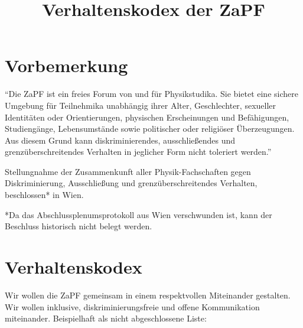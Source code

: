 \documentclass[12pt,oneside]{scrartcl}
\begin{document}
\title{Verhaltenskodex der ZaPF%
  \label{verhaltenskodex-der-zapf}}
\author{}
\date{}
\maketitle


\section{Vorbemerkung%
  \label{vorbemerkung}%
}

“Die ZaPF ist ein freies Forum von und für Physikstudika. Sie bietet eine
sichere Umgebung für Teilnehmika unabhängig ihrer Alter, Geschlechter, sexueller
Identitäten oder Orientierungen, physischen Erscheinungen und Befähigungen,
Studiengänge, Lebensumstände sowie politischer oder religiöser
Überzeugungen. Aus diesem Grund kann diskriminierendes, ausschließendes und
grenzüberschreitendes Verhalten in jeglicher Form nicht toleriert werden.”

Stellungnahme der Zusammenkunft aller Physik-Fachschaften gegen Diskriminierung,
Ausschließung und grenzüberschreitendes Verhalten, \textquotedbl{}beschlossen\textquotedbl{}* in Wien.

*Da das Abschlussplenumsprotokoll aus Wien verschwunden ist, kann der Beschluss
historisch nicht belegt werden.


\section{Verhaltenskodex%
  \label{verhaltenskodex}%
}

Wir wollen die ZaPF gemeinsam in einem respektvollen Miteinander gestalten. Wir
wollen inklusive, diskriminierungsfreie und offene Kommunikation
miteinander. Beispielhaft als nicht abgeschlossene Liste:
\end{document}
